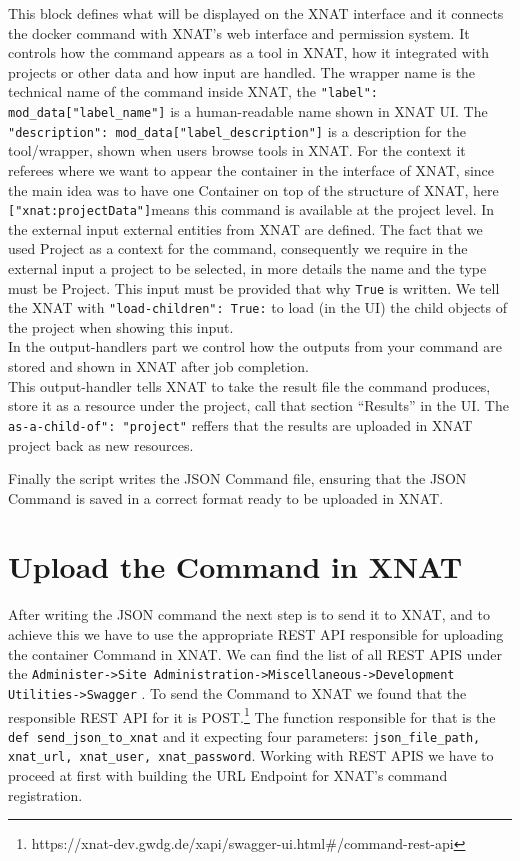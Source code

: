 This block defines what will be displayed on the XNAT interface and it connects the docker command with XNAT's web interface and permission system. It controls how the command appears as a tool in XNAT, how it integrated with projects or other data and how input are handled.
The wrapper name is the technical name of the command inside XNAT, the \texttt{"label": mod\_data["label\_name"]} is a human-readable name shown in XNAT \ac{UI}. The \texttt{"description": mod\_data["label\_description"]} is a description for the tool/wrapper, shown when users browse tools in XNAT. For the context it referees where we want to appear the container in the interface of XNAT, since the main idea was to have one Container on top of the structure of XNAT, here \texttt{["xnat:projectData"]}means this command is available at the project level.
 In the external input external entities from XNAT are defined. The fact that we used Project as a context for the command, consequently we require in the external input a project to be selected, in more details the name and the type must be Project. This input must be provided that why \texttt{True} is written.
 We tell the XNAT with \texttt{"load-children": True:} to load (in the UI) the child objects of the project when showing this input.\\
 In the output-handlers part we control  how the outputs from your command are stored and shown in XNAT after job completion.\\
 This output-handler tells XNAT to take the result file the command produces, store it as a resource under the project, call that section “Results” in the UI. 
 The \texttt{as-a-child-of": "project"} reffers that the results are uploaded in XNAT project back as new resources.

 Finally the script writes the JSON Command file, ensuring that the JSON Command is saved in a correct format ready to be uploaded in XNAT.
 
 \section{Upload the Command in XNAT}

 After writing the JSON command the next step is to send it to XNAT, and to achieve this we have to use the appropriate REST API responsible for uploading the container Command in XNAT.
 We can find the list of all REST APIS under the \texttt{Administer->Site Administration->Miscellaneous->Development Utilities->Swagger} .
 To send the Command to XNAT we found that the responsible REST API for it is POST.\footnote{https://xnat-dev.gwdg.de/xapi/swagger-ui.html\#/command-rest-api}
 The function responsible for that is the \texttt{def send\_json\_to\_xnat} and it expecting four parameters: \texttt{json\_file\_path, xnat\_url, xnat\_user, xnat\_password}. Working with REST APIS we have to proceed at first with building the URL Endpoint for XNAT’s command registration.
 
